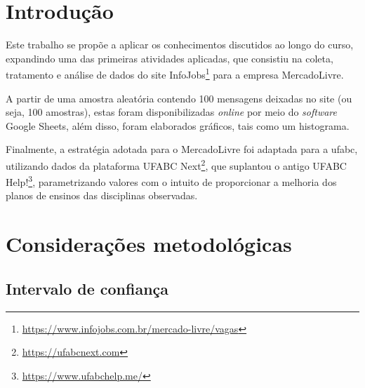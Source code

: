 	\tableofcontents 
	\newpage \listoffigures
	\newpage \listoftables
	\textual
	
	
	
	
	\chapter{Introdução}
	
	Este trabalho se propõe a aplicar os conhecimentos discutidos ao longo do curso, expandindo uma das primeiras atividades aplicadas, que consistiu na coleta, tratamento e análise de dados do site InfoJobs\footnote{\url{https://www.infojobs.com.br/mercado-livre/vagas}} para a empresa MercadoLivre.
	
	A partir de uma amostra aleatória contendo 100 mensagens deixadas no site (ou seja, 100 amostras), estas foram disponibilizadas \textit{online} por meio do \textit{software} Google Sheets, além disso, foram elaborados gráficos, tais como um histograma.
	
	Finalmente, a estratégia adotada para o MercadoLivre foi adaptada para a \gls{ufabc}, utilizando dados da plataforma UFABC Next\footnote{\url{https://ufabcnext.com}}, que suplantou o antigo UFABC Help!\footnote{\url{https://www.ufabchelp.me/}}, parametrizando valores com o intuito de proporcionar a melhoria dos planos de ensinos das disciplinas observadas.
	
	\chapter{Considerações metodológicas} \label{sec:metodologia}
	
	\section{Intervalo de confiança}
	
